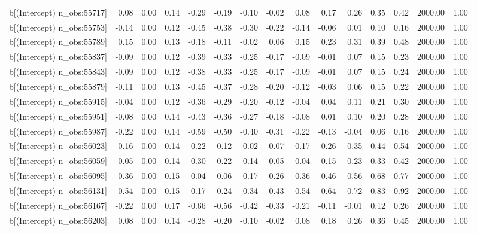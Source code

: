 \begin{table}[ht]
\begin{tabular}{rrrrrrrrrrrrrrr}
  b[(Intercept) n\_obs:55717] & 0.08 & 0.00 & 0.14 & -0.29 & -0.19 & -0.10 & -0.02 & 0.08 & 0.17 & 0.26 & 0.35 & 0.42 & 2000.00 & 1.00 \\ 
  b[(Intercept) n\_obs:55753] & -0.14 & 0.00 & 0.12 & -0.45 & -0.38 & -0.30 & -0.22 & -0.14 & -0.06 & 0.01 & 0.10 & 0.16 & 2000.00 & 1.00 \\ 
  b[(Intercept) n\_obs:55789] & 0.15 & 0.00 & 0.13 & -0.18 & -0.11 & -0.02 & 0.06 & 0.15 & 0.23 & 0.31 & 0.39 & 0.48 & 2000.00 & 1.00 \\ 
  b[(Intercept) n\_obs:55837] & -0.09 & 0.00 & 0.12 & -0.39 & -0.33 & -0.25 & -0.17 & -0.09 & -0.01 & 0.07 & 0.15 & 0.23 & 2000.00 & 1.00 \\ 
  b[(Intercept) n\_obs:55843] & -0.09 & 0.00 & 0.12 & -0.38 & -0.33 & -0.25 & -0.17 & -0.09 & -0.01 & 0.07 & 0.15 & 0.24 & 2000.00 & 1.00 \\ 
  b[(Intercept) n\_obs:55879] & -0.11 & 0.00 & 0.13 & -0.45 & -0.37 & -0.28 & -0.20 & -0.12 & -0.03 & 0.06 & 0.15 & 0.22 & 2000.00 & 1.00 \\ 
  b[(Intercept) n\_obs:55915] & -0.04 & 0.00 & 0.12 & -0.36 & -0.29 & -0.20 & -0.12 & -0.04 & 0.04 & 0.11 & 0.21 & 0.30 & 2000.00 & 1.00 \\ 
  b[(Intercept) n\_obs:55951] & -0.08 & 0.00 & 0.14 & -0.43 & -0.36 & -0.27 & -0.18 & -0.08 & 0.01 & 0.10 & 0.20 & 0.28 & 2000.00 & 1.00 \\ 
  b[(Intercept) n\_obs:55987] & -0.22 & 0.00 & 0.14 & -0.59 & -0.50 & -0.40 & -0.31 & -0.22 & -0.13 & -0.04 & 0.06 & 0.16 & 2000.00 & 1.00 \\ 
  b[(Intercept) n\_obs:56023] & 0.16 & 0.00 & 0.14 & -0.22 & -0.12 & -0.02 & 0.07 & 0.17 & 0.26 & 0.35 & 0.44 & 0.54 & 2000.00 & 1.00 \\ 
  b[(Intercept) n\_obs:56059] & 0.05 & 0.00 & 0.14 & -0.30 & -0.22 & -0.14 & -0.05 & 0.04 & 0.15 & 0.23 & 0.33 & 0.42 & 2000.00 & 1.00 \\ 
  b[(Intercept) n\_obs:56095] & 0.36 & 0.00 & 0.15 & -0.04 & 0.06 & 0.17 & 0.26 & 0.36 & 0.46 & 0.56 & 0.68 & 0.77 & 2000.00 & 1.00 \\ 
  b[(Intercept) n\_obs:56131] & 0.54 & 0.00 & 0.15 & 0.17 & 0.24 & 0.34 & 0.43 & 0.54 & 0.64 & 0.72 & 0.83 & 0.92 & 2000.00 & 1.00 \\ 
  b[(Intercept) n\_obs:56167] & -0.22 & 0.00 & 0.17 & -0.66 & -0.56 & -0.42 & -0.33 & -0.21 & -0.11 & -0.01 & 0.12 & 0.26 & 2000.00 & 1.00 \\ 
  b[(Intercept) n\_obs:56203] & 0.08 & 0.00 & 0.14 & -0.28 & -0.20 & -0.10 & -0.02 & 0.08 & 0.18 & 0.26 & 0.36 & 0.45 & 2000.00 & 1.00 \\ 

\end{tabular}
\end{table}

